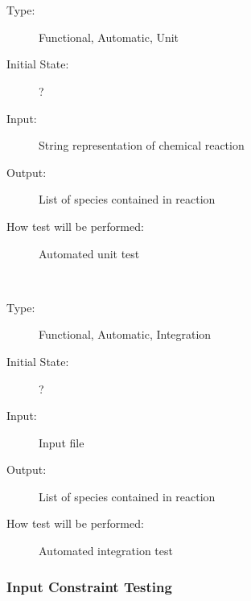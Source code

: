 \documentclass[12pt, titlepage]{article}
\newcounter{testnum} %
\begin{document}
\\
\begin{addmargin}[2em]{0em}
\\
\begin{addmargin}[2em]{0em}
\begin{description}
\item[Type:] Functional, Automatic, Unit
					
\item[Initial State:] ?
					
\item[Input:] String representation of chemical reaction
					
\item[Output:] List of species contained in reaction
					
\item[How test will be performed:] Automated unit test\\
\end{description}
\end{addmargin}

\\
\begin{addmargin}[2em]{0em}
\begin{description}
\item[Type:] Functional, Automatic, Integration
					
\item[Initial State:] ?
					
\item[Input:] Input file
					
\item[Output:] List of species contained in reaction
					
\item[How test will be performed:] Automated integration test\\
\end{description}
\end{addmargin}
\end{addmargin}

\subsubsection{Input Constraint Testing}
\end{document}
